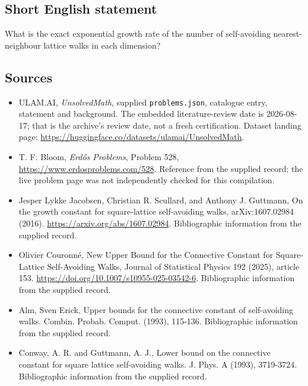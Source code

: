 \documentclass[11pt,a4paper]{article}
\begin{document}
\subsection{Short English statement}

What is the exact exponential growth rate of the number of self-avoiding nearest-neighbour lattice walks in each dimension?

\subsection{Sources}

{\small

\begin{itemize}

\item[\hypertarget{source:statement:1}{S1}] ULAM.AI, \emph{UnsolvedMath}, supplied \texttt{problems.json}, catalogue entry, statement and background. The embedded literature-review date is 2026-08-17; that is the archive’s review date, not a fresh certification. Dataset landing page: \url{https://huggingface.co/datasets/ulamai/UnsolvedMath}.

\item[\hypertarget{source:statement:2}{S2}] T. F. Bloom, \emph{Erdős Problems}, Problem 528, \url{https://www.erdosproblems.com/528}. Reference from the supplied record; the live problem page was not independently checked for this compilation.

\item[\hypertarget{source:statement:3}{S3}] Jesper Lykke Jacobsen, Christian R. Scullard, and Anthony J. Guttmann, On the growth constant for square-lattice self-avoiding walks, arXiv:1607.02984 (2016). \url{https://arxiv.org/abs/1607.02984}. Bibliographic information from the supplied record.

\item[\hypertarget{source:statement:4}{S4}] Olivier Couronné, New Upper Bound for the Connective Constant for Square-Lattice Self-Avoiding Walks, Journal of Statistical Physics 192 (2025), article 153. \url{https://doi.org/10.1007/s10955-025-03542-6}. Bibliographic information from the supplied record.

\item[\hypertarget{source:statement:5}{S5}] Alm, Sven Erick, Upper bounds for the connective constant of self-avoiding walks. Combin. Probab. Comput. (1993), 115-136. Bibliographic information from the supplied record.

\item[\hypertarget{source:statement:6}{S6}] Conway, A. R. and Guttmann, A. J., Lower bound on the connective constant for square lattice self-avoiding walks. J. Phys. A (1993), 3719-3724. Bibliographic information from the supplied record.

\end{itemize}

}

\label{end:statement}
\end{document}
